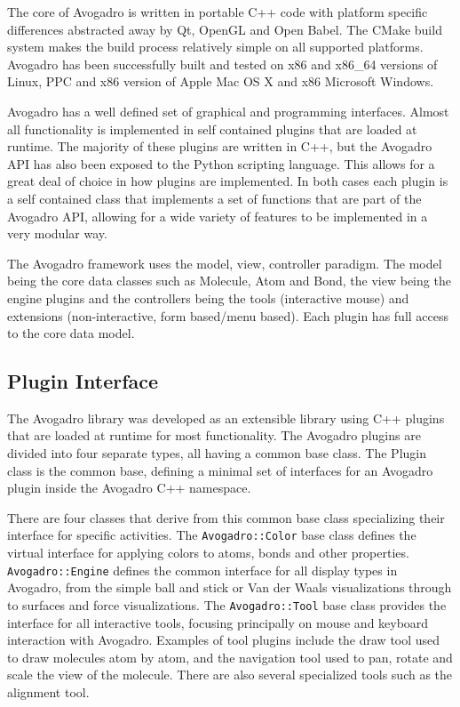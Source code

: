 \documentclass[10pt]{bmc_article}
\newenvironment{bmcformat}{\begin{raggedright}
\baselineskip20pt\sloppy\setboolean{publ}{false}}{\end{raggedright}
\baselineskip20pt\sloppy}
\begin{document}
\begin{bmcformat}
The core of Avogadro is written in portable C++ code with platform specific
differences abstracted away by Qt, OpenGL and Open Babel. The CMake build system
makes the build process relatively simple on all supported platforms. Avogadro
has been successfully built and tested on x86 and x86\_64 versions of Linux, PPC
and x86 version of Apple Mac OS X and x86 Microsoft Windows.

Avogadro has a well defined set of graphical and programming interfaces. Almost
all functionality is implemented in self contained plugins that are loaded at
runtime. The majority of these plugins are written in C++, but the Avogadro API
has also been exposed to the Python scripting language. This allows for a great
deal of choice in how plugins are implemented. In both cases each plugin is a
self contained class that implements a set of functions that are part of the
Avogadro API, allowing for a wide variety of features to be implemented in a
very modular way.

The Avogadro framework uses the model, view, controller paradigm. The model
being the core data classes such as Molecule, Atom and Bond, the view being the
engine plugins and the controllers being the tools (interactive mouse) and
extensions (non-interactive, form based/menu based). Each plugin has full access
to the core data model.

\subsection{Plugin Interface}

The Avogadro library was developed as an extensible library using C++ plugins
that are loaded at runtime for most functionality. The Avogadro plugins are
divided into four separate types, all having a common base class. The Plugin
class is the common base, defining a minimal set of interfaces for an Avogadro
plugin inside the Avogadro C++ namespace.

There are four classes that derive from this common base class specializing
their interface for specific activities. The {\tt Avogadro::Color} base class defines
the virtual interface for applying colors to atoms, bonds and other properties.
 {\tt Avogadro::Engine} defines the common interface for all display types in Avogadro,
from the simple ball and stick or Van der Waals visualizations through to
surfaces and force visualizations. The {\tt Avogadro::Tool} base class provides
the interface for all interactive tools, focusing principally on mouse and
keyboard interaction with Avogadro. Examples of tool plugins include the draw
tool used to draw molecules atom by atom, and the navigation tool used to pan,
rotate and scale the view of the molecule. There are also several specialized
tools such as the alignment tool.


\end{bmcformat}
\end{document}
